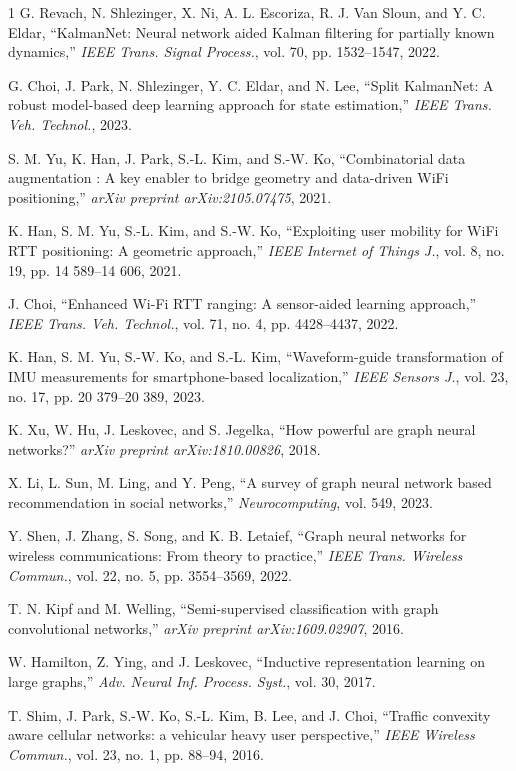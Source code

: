 \documentclass[journal]{IEEEtran}
\begin{document}
\begin{thebibliography}{1}
G. Revach, N. Shlezinger, X. Ni, A. L. Escoriza, R. J. Van Sloun, and Y. C. Eldar, ``KalmanNet: Neural network aided Kalman filtering for partially known dynamics,'' \emph{IEEE Trans. Signal Process.}, vol. 70, pp. 1532–1547, 2022.

G. Choi, J. Park, N. Shlezinger, Y. C. Eldar, and N. Lee, ``Split KalmanNet: A robust model-based deep learning approach for state estimation,'' \emph{IEEE Trans. Veh. Technol.}, 2023.

S. M. Yu, K. Han, J. Park, S.-L. Kim, and S.-W. Ko, ``Combinatorial data augmentation : A key enabler to bridge geometry and data-driven WiFi positioning,'' \emph{arXiv preprint arXiv:2105.07475}, 2021.

K. Han, S. M. Yu, S.-L. Kim, and S.-W. Ko, ``Exploiting user mobility for WiFi RTT positioning: A geometric approach,'' \emph{IEEE Internet of Things J.}, vol. 8, no. 19, pp. 14 589–14 606, 2021.

J. Choi, ``Enhanced Wi-Fi RTT ranging: A sensor-aided learning approach,'' \emph{IEEE Trans. Veh. Technol.}, vol. 71, no. 4, pp. 4428–4437, 2022.

K. Han, S. M. Yu, S.-W. Ko, and S.-L. Kim, ``Waveform-guide transformation of IMU measurements for smartphone-based localization,'' \emph{IEEE Sensors J.}, vol. 23, no. 17, pp. 20 379–20 389, 2023.

K. Xu, W. Hu, J. Leskovec, and S. Jegelka, ``How powerful are graph neural networks?'' \emph{arXiv preprint arXiv:1810.00826}, 2018.

X. Li, L. Sun, M. Ling, and Y. Peng, ``A survey of graph neural network based recommendation in social networks,'' \emph{Neurocomputing}, vol. 549, 2023.

Y. Shen, J. Zhang, S. Song, and K. B. Letaief, ``Graph neural networks for wireless communications: From theory to practice,'' \emph{IEEE Trans. Wireless Commun.}, vol. 22, no. 5, pp. 3554–3569, 2022.

T. N. Kipf and M. Welling, ``Semi-supervised classification with graph convolutional networks,'' \emph{arXiv preprint arXiv:1609.02907}, 2016.

W. Hamilton, Z. Ying, and J. Leskovec, ``Inductive representation learning on large graphs,'' \emph{Adv. Neural Inf. Process. Syst.}, vol. 30, 2017.

T. Shim, J. Park, S.-W. Ko, S.-L. Kim, B. Lee, and J. Choi, ``Traffic convexity aware cellular networks: a vehicular heavy user perspective,'' \emph{IEEE Wireless Commun.}, vol. 23, no. 1, pp. 88–94, 2016.


\end{thebibliography}
\end{document}
